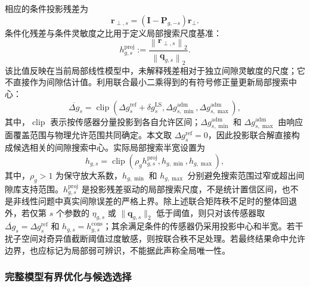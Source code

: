 \documentclass[UTF8,12pt,a4paper]{ctexart}
\begin{document}
相应的条件投影残差为
\begin{equation}
\bm r_{\perp,s}
=\left(\bm I-\bm P_{g,-s}\right)\bm r_{\perp}.
\label{eq:conditional_gap_residual}
\end{equation}
条件化残差与条件灵敏度之比用于定义局部搜索尺度基准：
\begin{equation}
 h_{g,s}^{\mathrm{proj}}
:=\frac{\left\lVert\bm r_{\perp,s}\right\rVert_2}
{\left\lVert\bm q_{g,s}\right\rVert_2}.
\label{eq:gap_bound}
\end{equation}
该比值反映在当前局部线性模型中，未解释残差相对于独立间隙灵敏度的尺度；它不直接作为间隙估计值。利用联合最小二乘得到的有符号修正量更新局部搜索中心：
\begin{equation}
\overline{\Delta g}_s
=\operatorname{clip}\!\left(
\Delta g_s^{\mathrm{ref}}
+\delta g_s^{\mathrm{LS}},
\Delta g_{s,\min}^{\mathrm{adm}},
\Delta g_{s,\max}^{\mathrm{adm}}
\right),
\label{eq:gap_center}
\end{equation}
其中，$\operatorname{clip}$ 表示按传感器分量投影到各自允许区间；$\Delta g_{s,\min}^{\mathrm{adm}}$ 和 $\Delta g_{s,\max}^{\mathrm{adm}}$ 由响应面覆盖范围与物理允许范围共同确定。本文取 $\Delta g_s^{\mathrm{ref}}=0$，因此投影联合解直接构成候选相关的间隙搜索中心。实际局部搜索半宽设置为
\begin{equation}
h_{g,s}
=\operatorname{clip}\!\left(
\rho_g h_{g,s}^{\mathrm{proj}},
h_{g,\min},
h_{g,\max}
\right),
\label{eq:local_range}
\end{equation}
其中，$\rho_g>1$ 为保守放大系数，$h_{g,\min}$ 和 $h_{g,\max}$ 分别避免搜索范围过窄或超出间隙库支持范围。$h_{g,s}^{\mathrm{proj}}$ 是投影残差驱动的局部搜索尺度，不是统计置信区间，也不是非线性问题中真实间隙误差的严格上界。除上述联合矩阵秩不足时的整体回退外，若仅第 $s$ 个参数的 $\eta_{g,s}$ 或 $\|\bm q_{g,s}\|_2$ 低于阈值，则只对该传感器取 $\overline{\Delta g}_s=\Delta g_s^{\mathrm{ref}}$ 和 $h_{g,s}=h_{g,s}^{\mathrm{cons}}$；其余满足条件的传感器仍采用投影中心和半宽。若干扰子空间对奇异值截断阈值过度敏感，则按联合秩不足处理。若最终结果命中允许边界，也应标记为局部弱可辨识，不能据此声称全局唯一性。

\subsubsection{完整模型有界优化与候选选择}
\end{document}
